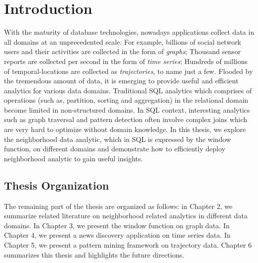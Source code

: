\chapter{Introduction}
With the maturity of database technologies, nowadays
applications collect data in all domains at an
unprecedented scale. For example, billions of 
social network users and their activities are collected in the form
of \emph{graphs}; Thousand sensor reports are collected per second
in the form of \emph{time series}; Hundreds of millions of temporal-locations
are collected as \emph{trajectories}, to name just a few. Flooded by the
tremendous amount of data, it is emerging to 
provide useful and efficient analytics for various data domains.
Traditional SQL analytics which comprises 
of operations (such as, partition, sorting and aggregation) in the relational domain
become limited in non-structured domains.
In SQL context, interesting analytics such as graph traversal and pattern detection
often involve complex joins which are very hard to optimize 
without domain knowledge.
In this thesis, we explore the neighborhood data analytic, which
in SQL is expressed by the window function,
on different domains and demonstrate how to efficiently deploy
neighborhood analytic to gain useful insights.






\section{Thesis Organization}
The remaining part of the thesis are organized as follows: in Chapter 2, we summarize related literature on neighborhood related analytics in different data domains. In Chapter 3, we present the window function on graph data. In Chapter 4, we present a news discovery application on time series data.
In Chapter 5, we present a pattern mining framework on trajectory data. Chapter 6 summarizes this thesis and highlights the future directions.
